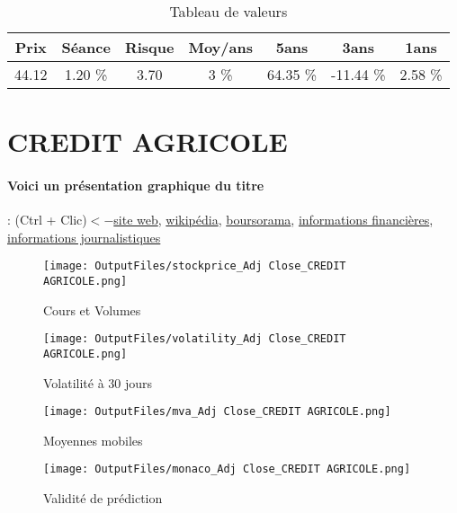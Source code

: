 \documentclass[11pt,a4paper]{report}%
\begin{document}
\begin{table}[H]
  \centering
    \begin{tabular}{|c|c|c|c|c|c|c|}
    \hline
    Prix & Séance & Risque  & Moy/ans & 5ans & 3ans & 1ans \\
    \hline
    44.12 &    1.20 \%    & 3.70 & 3 \% & 64.35 \% & -11.44 \% & 2.58 \% \\
    \hline
    \end{tabular}%
        \label{tab:table_BNP PARIBAS}%
      \caption{Tableau de valeurs}
\end{table}%

\newpage

\section{CREDIT AGRICOLE}

\paragraph{Voici un présentation graphique du titre} : (Ctrl + Clic)$<-$\href{https://www.credit-agricole.com/finance/finance/publications-financieres}{site web}, \href{https://fr.wikipedia.org/wiki/Cr%C3%A9dit_agricole}{wikipédia}, \href{https://www.boursorama.com/cours/1rPACA}{boursorama}, \href{https://www.qwant.com/?q=site:https:%2f%2fwww.easybourse.com%2faction-societe%2fCREDIT-AGRICOLE&t=web&client=ext-firefox-hp}{informations financières}, \href{https://bourse.lerevenu.com/cours-de-bourse/fiche-valeur-synthese/CREDIT-AGRICOLE/ACA-FR}{informations journalistiques}
\begin{figure}[!htb]
   \begin{minipage}{0.5\textwidth}
     \centering
     \texttt{[image: OutputFiles/stockprice\_Adj Close\_CREDIT AGRICOLE.png]}
     \caption{Cours et Volumes}\label{Fig:price_CREDIT AGRICOLE}
   \end{minipage}\hfill
   \begin{minipage}{0.5\textwidth}
     \centering
     \texttt{[image: OutputFiles/volatility\_Adj Close\_CREDIT AGRICOLE.png]}
     \caption{Volatilité à 30 jours}\label{Fig:volat_CREDIT AGRICOLE}
   \end{minipage}
\end{figure}
\begin{figure}[!htb]
   \begin{minipage}{0.5\textwidth}
     \centering
     \texttt{[image: OutputFiles/mva\_Adj Close\_CREDIT AGRICOLE.png]}
     \caption{Moyennes mobiles}\label{Fig:mva_CREDIT AGRICOLE}
   \end{minipage}\hfill
   \begin{minipage}{0.5\textwidth}
     \centering
     \texttt{[image: OutputFiles/monaco\_Adj Close\_CREDIT AGRICOLE.png]}
     \caption{Validité de prédiction}\label{Fig:prediction_CREDIT AGRICOLE}
   \end{minipage}
\end{figure}
\end{document}
